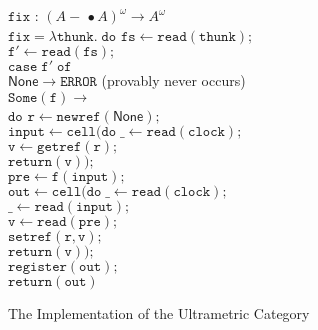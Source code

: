 \documentclass[nocopyrightspace,preprint]{sigplanconf}
\newcommand{\term}[1]{\ensuremath{\mathtt{{#1}}}}
\newcommand{\lollishrink}{-\!\!\!\,\bullet}
\newcommand{\None}{\mathsf{None}}
\begin{document}
\begin{figure}
{\begin{tabbing}
\term{fix} : $(A \lollishrink A)^\omega \to A^\omega$ \\
\term{fix = \lambda thunk.\;do}
  \=\term{fs \leftarrow read(thunk);} \\
  \>\term{f' \leftarrow read(fs);} \\
  \>\term{case\;f'\;of}\\
  \>\;\;\=\term{\None \to ERROR} (provably never occurs)\\
  \>    \>\term{Some(f) \to} \\
  \>    \>\;\;\term{do} \=\term{r \leftarrow newref(\None);}\\
  \>    \>  \>\term{input \leftarrow cell(do\;}\=\term{\_ \leftarrow read(clock);}\\
  \>    \>  \>                                 \>\term{v \leftarrow getref(r);}\\
  \>    \>  \>                                 \>\term{return(v));}\\
  \>    \>  \>\term{pre \leftarrow f(input);}\\
  \>    \>  \>\term{out \leftarrow cell(do\;}\=\term{\_ \leftarrow read(clock);} \\
  \>    \>  \>                               \>\term{\_ \leftarrow read(input);} \\
  \>    \>  \>                               \>\term{v \leftarrow read(pre);}\\
  \>    \>  \>                               \>\term{setref(r, v);}\\
  \>    \>  \>                               \>\term{return(v));}\\
  \>    \>  \>\term{register(out);}\\
  \>    \>  \>\term{return(out)}
\end{tabbing}
}
\caption{The Implementation of the Ultrametric Category}
\label{ultrametric-implementation}
\end{figure}
\end{document}
